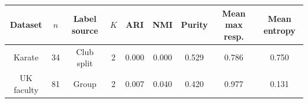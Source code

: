 \begin{tabular}{ccccccccc}
\hline
Dataset & $n$ & Label source & $K$  & ARI & NMI & Purity & Mean max resp. & Mean entropy \\
\hline
Karate & 34 & Club split & 2   & 0.000 & 0.000 & 0.529 & 0.786 & 0.750 \\
UK faculty & 81 & Group  & 2 & 0.007 & 0.040 & 0.420 & 0.977 & 0.131 \\
\hline
\end{tabular}
